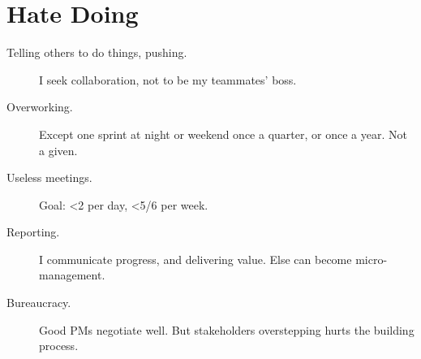 \documentclass[10pt, a4paper, twocolumn]{article}
\begin{document}










%


%
%
%

\vfill\eject

\section*{Hate Doing}

\begin{description}
 \item[Telling others to do things, pushing.]
 I seek %
 collaboration, %
 not to be my teammates' boss.
 \item[Overworking.] Except one sprint at night or weekend once a quarter, or once a year.
 Not a given.
 \item[Useless meetings.] Goal: <2 per day,  <5/6 per week. %
 \item[Reporting.]
 I communicate progress, %
 and delivering value. %
 Else can become micro-management.
  \item[Bureaucracy.] Good PMs negotiate well.
  But stakeholders overstepping hurts the building process.
\end{description}
\end{document}
